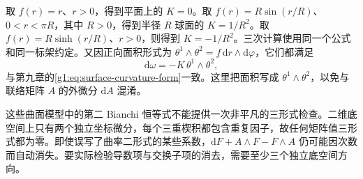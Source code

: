 取 \(f(r)=r\)、\(r>0\)，得到平面上的 \(K=0\)。取 \(f(r)=R\sin(r/R)\)、\(0<r<\pi R\)，其中 \(R>0\)，得到半径 \(R\) 球面的 \(K=1/R^2\)。取 \(f(r)=R\sinh(r/R)\)、\(r>0\)，则得到 \(K=-1/R^2\)。三次计算使用同一个公式和同一标架约定。又因正向面积形式为 \(\theta^1\wedge\theta^2=f\,\mathrm{d}r\wedge\mathrm{d}\varphi\)，它们都满足
\[
	\mathrm{d}\omega=-K\,\theta^1\wedge\theta^2,
\]
与第九章的\eqref{g1:eq:surface-curvature-form}一致。这里把面积写成 \(\theta^1\wedge\theta^2\)，以免与联络矩阵 \(A\) 的外微分 \(\mathrm{d}A\) 混淆。

\ProseParagraphBreak

这些曲面模型中的第二 Bianchi 恒等式不能提供一次非平凡的三形式检查。二维底空间上只有两个独立坐标微分，每个三重楔积都包含重复因子，故任何矩阵值三形式都为零。即使误写了曲率二形式的某些系数，\(\mathrm{d}F+A\wedge F-F\wedge A\) 仍可能因次数而自动消失。要实际检验导数项与交换子项的消去，需要至少三个独立底空间方向。

